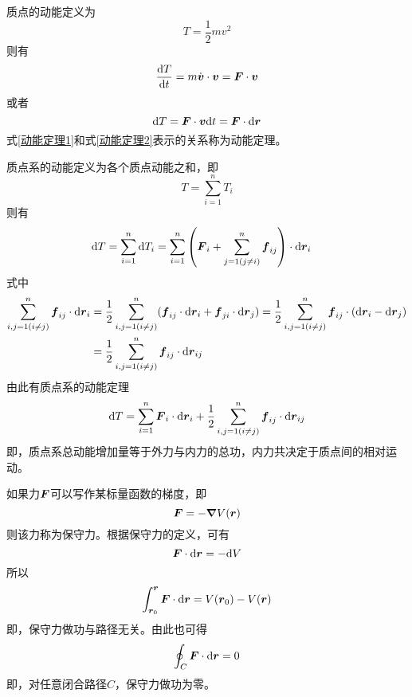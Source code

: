 质点的{\heiti 动能}定义为
\begin{equation}
	T = \frac12 mv^2
\end{equation}
则有
\begin{equation}
	\frac{\mathrm{d} T}{\mathrm{d} t} = m\dot{\boldsymbol{v}} \cdot \boldsymbol{v} = \boldsymbol{F} \cdot \boldsymbol{v}
	\label{动能定理1}
\end{equation}
或者
\begin{equation}
	\mathrm{d}T = \boldsymbol{F} \cdot \boldsymbol{v}\mathrm{d} t = \boldsymbol{F} \cdot \mathrm{d} \boldsymbol{r}
	\label{动能定理2}
\end{equation}
式\eqref{动能定理1}和式\eqref{动能定理2}表示的关系称为{\heiti 动能定理}。

质点系的动能定义为各个质点动能之和，即
\begin{equation}
	T = \sum_{i=1}^n T_i
\end{equation}
则有
\begin{align*}
	\mathrm{d} T & = \sum_{i=1}^n \mathrm{d} T_i = \sum_{i=1}^n \left(\boldsymbol{F}_i + \sum_{j=1(j\neq i)}^n \boldsymbol{f}_{ij}\right) \cdot \mathrm{d} \boldsymbol{r}_i
\end{align*}
式中
\begin{align*}
	\sum_{i,j=1(i\neq j)}^n \boldsymbol{f}_{ij} \cdot \mathrm{d} \boldsymbol{r}_i & = \frac12 \sum_{i,j=1(i\neq j)}^n (\boldsymbol{f}_{ij} \cdot \mathrm{d} \boldsymbol{r}_i +\boldsymbol{f}_{ji} \cdot \mathrm{d} \boldsymbol{r}_j) = \frac12 \sum_{i,j=1(i\neq j)}^n \boldsymbol{f}_{ij} \cdot (\mathrm{d}\boldsymbol{r}_i - \mathrm{d} \boldsymbol{r}_j) \\
	& = \frac12 \sum_{i,j=1(i\neq j)}^n \boldsymbol{f}_{ij} \cdot \mathrm{d} \boldsymbol{r}_{ij}
\end{align*}
由此有{\heiti 质点系的动能定理}
\begin{equation}
	\mathrm{d} T = \sum_{i=1}^n \boldsymbol{F}_i \cdot \mathrm{d} \boldsymbol{r}_i + \frac12 \sum_{i,j=1(i\neq j)}^n \boldsymbol{f}_{ij} \cdot \mathrm{d} \boldsymbol{r}_{ij}
\end{equation}
即，质点系总动能增加量等于外力与内力的总功，内力共决定于质点间的相对运动。

如果力$\boldsymbol{F}$可以写作某标量函数的梯度，即
\begin{equation}
	\boldsymbol{F} = -\boldsymbol{\nabla} V(\boldsymbol{r})
\end{equation}
则该力称为{\heiti 保守力}。根据保守力的定义，可有
\begin{equation}
	\boldsymbol{F} \cdot \mathrm{d} \boldsymbol{r} = -\mathrm{d}V
\end{equation}
所以
\begin{equation*}
	\int_{\boldsymbol{r}_0}^{\boldsymbol{r}} \boldsymbol{F} \cdot \mathrm{d} \boldsymbol{r} = V(\boldsymbol{r}_0) - V(\boldsymbol{r})
\end{equation*}
即，保守力做功与路径无关。由此也可得
\begin{equation}
	\oint_C \boldsymbol{F} \cdot \mathrm{d} \boldsymbol{r} = 0
\end{equation}
即，对任意闭合路径$C$，保守力做功为零。

